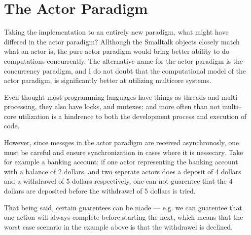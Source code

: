 \section{The Actor Paradigm}
Taking the implementation to an entirely new paradigm, what might have differed in the actor paradigm?
Allthough the Smalltalk objects closely match what an actor is, the pure actor paradigm would bring better ability to do computations concurrently.
The alternative name for the actor paradigm is the concurrency paradigm, and I do not doubt that the computational model of the actor paradigm, is significantly better at utilizing multicore systems.

Even thought most programming languages have things as threads and multi--processing, they also have locks, and mutexes;
and more often than not multi--core utilization is a hindrence to both the development process and execution of code.

However, since messges in the actor paradigm are received asynchronosly, one must be careful and ensure synchronization in cases where it is nessecary.
Take for example a banking account; if one actor representing the banking account with a balance of 2 dollars,
and two seperate actors does a deposit of 4 dollars and a withdrawel of 5 dollars respectively,
one can not guarentee that the 4 dollars are deposited before the withdrawel of 5 dollars is tried.

That being said, certain guarentees can be made --- e.g. we can guarentee that one action will always complete before starting the next,
which means that the worst case scenario in the example above is that the withdrawel is declined.

